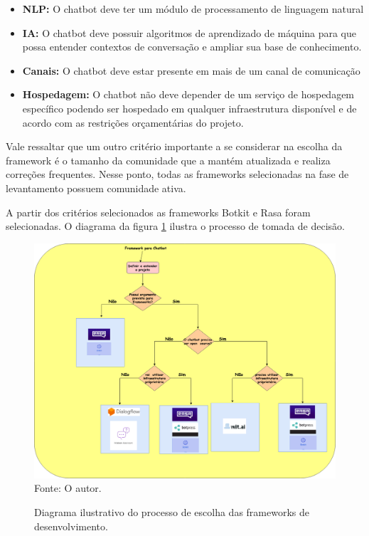 \begin{itemize}
    \item \textbf{NLP: } O chatbot deve ter um módulo de processamento de linguagem natural
    \item\textbf{ IA:}  O chatbot deve possuir algoritmos de aprendizado de máquina para que possa entender contextos de conversação e ampliar sua base de conhecimento.
    \item \textbf{Canais: } O chatbot deve estar presente em mais de um canal de comunicação
    \item\textbf{ Hospedagem:}  O chatbot não deve depender de um serviço de hospedagem específico podendo ser hospedado em qualquer infraestrutura disponível e de acordo com as restrições orçamentárias do projeto. 
    
\end{itemize}

Vale ressaltar que um outro critério importante a se considerar na escolha da framework é o tamanho da comunidade que a mantém atualizada e realiza correções frequentes. Nesse ponto, todas as frameworks selecionadas na fase de levantamento possuem comunidade ativa.  

A partir dos critérios selecionados as frameworks Botkit e Rasa foram selecionadas. O diagrama da figura \ref{fig:frame-decisao} ilustra o processo de tomada de decisão.

\begin{figure}[H]
  \caption{Diagrama ilustrativo do processo de escolha das frameworks de desenvolvimento.}

  \centering
  \includegraphics[scale=0.37]{Imagens/decisao_frame.png} 
  \label{fig:frame-decisao}
  Fonte: O autor.
\end{figure}



